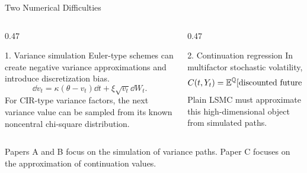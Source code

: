 \begin{frame}{Two Numerical Difficulties}
  \begin{columns}[T,onlytextwidth]
    \begin{column}{0.47\textwidth}
      \begin{block}{1. Variance simulation}
        Euler-type schemes can create negative variance approximations and introduce discretization bias.
        \[
          \dd v_t=\kappa(\theta-v_t)\dd t+\xi\sqrt{v_t}\dd W_t.
        \]
        For CIR-type variance factors, the next variance value can be sampled from its known noncentral chi-square distribution.
      \end{block}
    \end{column}
    \begin{column}{0.47\textwidth}
      \begin{block}{2. Continuation regression}
        In multifactor stochastic volatility,
        {\small
        \[
          C(t,Y_t)=\mathbb{E}^{\mathbb{Q}}[\hbox{discounted future value}\mid Y_t].
        \]}
        Plain LSMC must approximate this high-dimensional object from simulated paths.
      \end{block}
    \end{column}
  \end{columns}

  \vspace{0.5em}
  \centering
  \small Papers A and B focus on the simulation of variance paths. Paper C focuses on the approximation of continuation values.
\end{frame}

